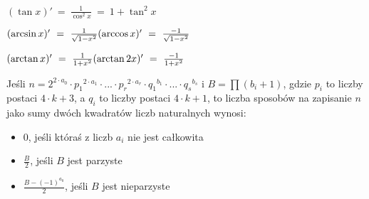 $(\tan x)'\ =\ \frac{1}{\cos^2 x}\ =\ 1 + \tan^2 x$

$(\arcsin x)'\ =\ \frac{1}{\sqrt{1-x^2}} \hfill
	(\arccos x)'\ =\ \frac{-1}{\sqrt{1-x^2}}$

$(\arctan x)'\ =\ \frac{1}{1+x^2} \hfill
	(\arctan2 x)'\ =\ \frac{-1}{1+x^2}$

Jeśli $n=2^{2 \cdot a_0} \cdot {p_1}^{2 \cdot a_1} \cdot ... \cdot {p_r}^{2 \cdot a_r} \cdot {q_1}^{b_1} \cdot ... \cdot {q_s}^{b_s}$ i $B= \prod (b_i+1)$, gdzie $p_i$ to liczby postaci $4 \cdot k + 3$, a $q_i$ to liczby postaci $4 \cdot k + 1$, to liczba sposobów na zapisanie $n$ jako sumy dwóch kwadratów liczb naturalnych wynosi:
      \begin{itemize}
        \item 0, jeśli któraś z liczb $a_i$ nie jest całkowita
        \item $\frac{B}{2}$, jeśli $B$ jest parzyste
        \item $\frac{B-(-1)^{a_0}}{2}$, jeśli $B$ jest nieparzyste
      \end{itemize}

